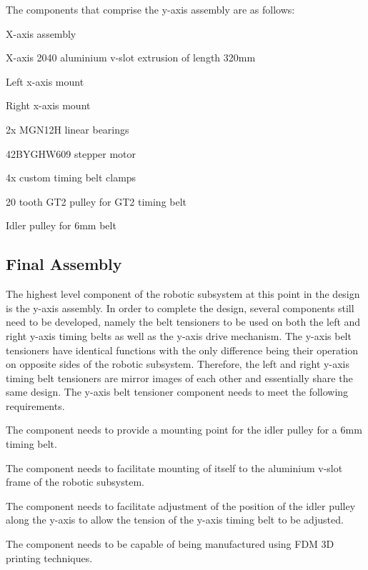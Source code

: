 The components that comprise the y-axis assembly are as follows:

\begin{compactitem}
	\item X-axis assembly
	\item X-axis 2040 aluminium v-slot extrusion of length 320mm
	\item Left x-axis mount
	\item Right x-axis mount
	\item 2x MGN12H linear bearings
	\item 42BYGHW609 stepper motor
	\item 4x custom timing belt clamps
	\item 20 tooth GT2 pulley for GT2 timing belt
	\item Idler pulley for 6mm belt
\end{compactitem}

\subsection{Final Assembly}

The highest level component of the robotic subsystem at this point in the design is the y-axis assembly. In order to complete the design, several components still need to be developed, namely the belt tensioners to be used on both the left and right y-axis timing belts as well as the y-axis drive mechanism. The y-axis belt tensioners have identical functions with the only difference being their operation on opposite sides of the robotic subsystem. Therefore, the left and right y-axis timing belt tensioners are mirror images of each other and essentially share the same design. The y-axis belt tensioner component needs to meet the following requirements.

\begin{compactitem}
	\item The component needs to provide a mounting point for the idler pulley for a 6mm timing belt.
	\item The component needs to facilitate mounting of itself to the aluminium v-slot frame of the robotic subsystem.
	\item The component needs to facilitate adjustment of the position of the idler pulley along the y-axis to allow the tension of the y-axis timing belt to be adjusted.
	\item The component needs to be capable of being manufactured using \ac{FDM} 3D printing techniques.
\end{compactitem}

